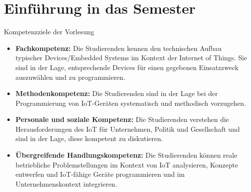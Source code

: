 
\section{Einführung in das Semester}

\begin{frame}{Kompetenzziele der Vorlesung}
    \begin{itemize}
        \item \textbf{Fachkompetenz:} Die Studierenden kennen den technischen Aufbau typischer
        Devices/Embedded Systems im Kontext der Internet of Things. Sie sind in der Lage,
        entsprechende Devices für einen gegebenen Einsatzzweck auszuwählen und zu programmieren.
        \medskip

        \item \textbf{Methodenkompetenz:} Die Studierenden sind in der Lage bei der Programmierung
        von IoT-Geräten systematisch und methodisch vorzugehen.
        \medskip

        \item \textbf{Personale und soziale Kompetenz:} Die Studierenden verstehen die Herausforderungen
        des IoT für Unternehmen, Politik und Gesellschaft und sind in der Lage, diese kompetent zu diskutieren.
        \medskip

        \item \textbf{Übergreifende Handlungskompetenz:} Die Studierenden können reale betriebliche
        Problemstellungen im Kontext von IoT analysieren, Konzepte entwerfen und IoT-fähige Geräte
        programmieren und im Unternehmenskontext integrieren.
        \medskip
    \end{itemize}
\end{frame}

